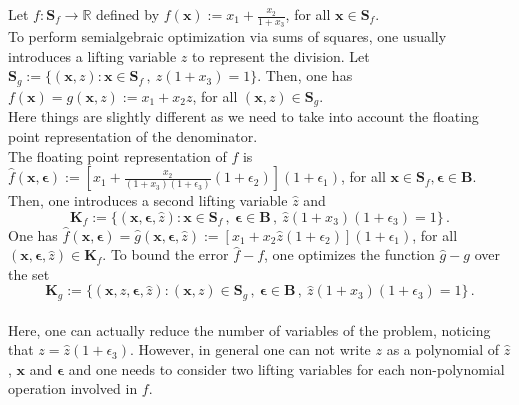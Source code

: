 \documentclass[preprint]{sigplanconf}
\newcommand{\R}{\mathbb{R}}
\newcommand{\x}{\mathbf{x}}
\newcommand{\epsilonb}{\boldsymbol{\epsilon}}
\def\S{\mathbf{S}}
\def\B{\mathbf{B}}
\def\K{\mathbf{K}}
\def\S{\mathbf{S}}
\theoremstyle{plain}
\begin{document}
Let $f : \S_f \to \R$ defined by $f(\x) := x_1 + \frac{x_2}{1 + x_3}$, for all $\x \in \S_f$. \\
To perform semialgebraic optimization via sums of squares, one usually introduces a lifting variable  $z$ to represent the division. Let $\S_g := \{(\x,z) : \x \in \S_f\,, \ z (1 + x_3) = 1  \}$.
Then, one has $f(\x) = g(\x,z) := x_1 + x_2 z$, for all $(\x,z) \in \S_g$. \\
Here things are slightly different as we need to take into account the floating point representation of the denominator.\\
The floating point representation of $f$ is $\hat{f}(\x,\epsilonb) := [x_1 + \frac{x_2}{(1 + x_3)(1 + \epsilon_3)}(1 + \epsilon_2)](1 + \epsilon_1)$, for all $\x \in \S_f, \epsilonb \in \B$.
Then, one introduces a second lifting variable $\hat{z}$ and 
\[\K_f := \{(\x, \epsilonb, \hat{z}) : \x \in \S_f \,, \ \epsilonb \in \B \,, \ \hat{z} (1 + x_3) (1 + \epsilon_3) = 1  \} \,. \]
One has $\hat{f}(\x,\epsilonb) = \hat{g}(\x,\epsilonb,\hat{z}) := [x_1 + x_2 \hat{z}(1+\epsilon_2) ](1+\epsilon_1)$, for all $(\x, \epsilonb, \hat{z}) \in \K_f$. 
To bound the error $\hat{f} -f$, one optimizes the function $\hat{g} - g$ over the set 
\[\K_g := \{(\x, z, \epsilonb, \hat{z}) : (\x,z) \in \S_g \,, \ \epsilonb \in \B \,, \ \hat{z} (1 + x_3) (1 + \epsilon_3) = 1  \} \,. \]
\\
Here, one can actually reduce the number of variables of the problem, noticing that $z = \hat{z} (1 + \epsilon_3)$. However, in general one can not write $z$ as a polynomial of $\hat{z}$, $\x$ and $\epsilonb$ and one needs to consider two lifting variables for each non-polynomial operation involved in $f$.
%
\end{document}
